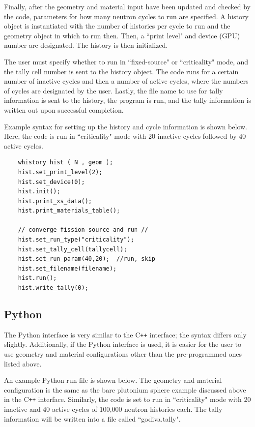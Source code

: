 \documentclass[twoside,a4paper]{refart}
\begin{document}
Finally, after the geometry and material input have been updated and checked by the code, parameters for 
how many neutron cycles to run are specified. A history object is instantiated with the number of
histories per cycle to run and the geometry object in which to run then. Then, a ``print level" and 
device (GPU) number are designated. The history is then initialized.

The user must specify whether to run in ``fixed-source" or ``criticality" mode, and the tally cell number
is sent to the history object. The code runs for a certain number of inactive cycles and then a number of
active cycles, where the numbers of cycles are designated by the user. Lastly, the file name to use for
tally information is sent to the history, the program is run, and the tally information is written out
upon successful completion.

Example syntax for setting up the history and cycle information is shown below. Here, the code is run in
``criticality" mode with 20 inactive cycles followed by 40 active cycles.

\begin{verbatim}
	whistory hist ( N , geom );
	hist.set_print_level(2);
	hist.set_device(0);
	hist.init();
	hist.print_xs_data();
	hist.print_materials_table();

	// converge fission source and run //
	hist.set_run_type("criticality");
	hist.set_tally_cell(tallycell);
	hist.set_run_param(40,20);  //run, skip
	hist.set_filename(filename);
	hist.run();
	hist.write_tally(0);
\end{verbatim}

\subsection{Python}

The Python interface is very similar to the C\texttt{++} interface; the syntax differs only slightly.
Additionally, if the Python interface is used, it is easier for the user to use geometry and material 
configurations other than the pre-programmed ones listed above.

An example Python run file is shown below. The geometry and material configuration is the same as the
bare plutonium sphere example discussed above in the C\texttt{++} interface. Similarly, the code is set
to run in ``criticality" mode with 20 inactive and 40 active cycles of 100,000 neutron histories each.
The tally information will be written into a file called ``godiva.tally".
\end{document}
